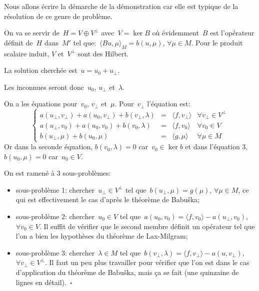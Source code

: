 \medskip
Nous allons écrire la démarche de la démonstration car elle est typique de la résolution de ce genre de problème.
\begin{demonstration}\footnotesize{}
On va se servir de~$H=V\oplus V^\bot$ avec~$V=\ker B$ où évidemment~$B$ est l'opérateur définit de~$H$ dans~$M'$ tel que:~$\langle Bu,\mu\rangle_M=b(u,\mu)$, $\forall\mu\in M$. Pour le produit scalaire induit, $V$ et~$V^\bot$ sont des Hilbert.

La solution cherchée est~$u=u_0+u_\bot$.

Les inconnues seront donc~$u_0$, $u_\bot$ et~$\lambda$.

On a les équations pour~$v_0$, $v_\bot$ et~$\mu$.
Pour~$v_\bot$ l'équation est:
\begin{equation}\left\{
\begin{array}{rcll}
a(u_\bot,v_\bot)+a(u_0,v_\bot)+b(v_\bot,\lambda) &=& \langle f,v_\bot\rangle &\forall v_\bot\in V^\bot\\
a(u_\bot,v_0)+a(u_0,v_0)+b(v_0,\lambda) &=& \langle f,v_0\rangle &\forall v_0\in V\\
b(u_\bot,\mu)+b(u_0,\mu) &=& \langle g,\mu\rangle &\forall \mu\in M
\end{array}
\right.\end{equation}
Or dans la seconde équation, $b(v_0,\lambda)=0$ car~$v_0\in\ker b$ et dans l'équation 3, $b(u_0,\mu)=0$
car~$u_0\in V$.

On est ramené à 3 sous-problèmes:
\begin{itemize}
  \item sous-problème 1: chercher~$u_\bot\in V^\bot$ tel que~$b(u_\bot,\mu)=g(\mu)$, $\forall\mu\in M$,
	ce qui est effectivement le cas d'après le théorème de Babuška;
  \item sous-problème 2: chercher~$u_0\in V$ tel que~$a(u_0,v_0)=\langle f,v_0\rangle-a(u_\bot,v_0)$,
	$\forall v_0\in V$.
	Il suffit de vérifier que le second membre définit un opérateur tel que l'on a bien les
	hypothèses du théorème de Lax-Milgram;
  \item sous-problème 3: chercher~$\lambda\in M$ tel que~$b(v_\bot,\lambda)=\langle f,v_\bot\rangle-a(u,v_\bot)$,
	$\forall v_\bot\in V^\bot$.
	Il faut un peu plus travailler pour vérifier que l'on est dans le cas d'application du théorème de Babuška, mais ça se
	fait (une quinzaine de lignes en détail).~$\square$
\end{itemize}
\end{demonstration}



